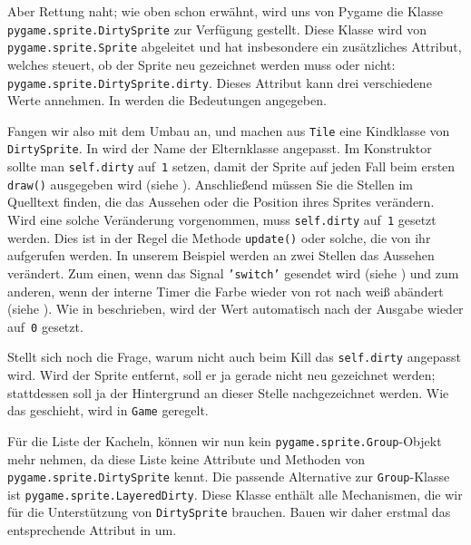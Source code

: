 
Aber Rettung naht; wie oben schon erwähnt, wird uns von Pygame die Klasse \texttt{pygame\-.sprite\-.Dirty\-Sprite} zur Verfügung gestellt. Diese Klasse wird von \texttt{pygame\-.sprite\-.Sprite} abgeleitet und hat insbesondere ein zusätzliches Attribut, welches steuert, ob der Sprite neu gezeichnet werden muss oder nicht: \texttt{pygame.sprite.DirtySprite.dirty}. Dieses Attribut kann drei verschiedene Werte annehmen. In  werden die Bedeutungen angegeben. 


Fangen wir also mit dem Umbau an, und machen aus \texttt{Tile} eine Kindklasse von \texttt{Dirty\-Sprite}. In  wird der Name der Elternklasse angepasst. Im Konstruktor sollte man \texttt{self.dirty} auf~\texttt{1} setzen, damit der Sprite auf jeden Fall beim ersten \texttt{draw()} ausgegeben wird (siehe ). Anschließend müssen Sie die Stellen im Quelltext finden, die das Aussehen oder die Position ihres Sprites verändern. Wird eine solche Veränderung vorgenommen, muss \texttt{self.dirty} auf~\texttt{1} gesetzt werden. Dies ist in der Regel die Methode \texttt{update()} oder solche, die von ihr aufgerufen werden. In unserem Beispiel werden an zwei Stellen das Aussehen verändert. Zum einen, wenn das Signal \texttt{'switch'} gesendet wird (siehe ) und zum anderen, wenn der interne Timer die Farbe wieder von rot nach weiß abändert (siehe ). Wie in  beschrieben, wird der Wert automatisch nach der Ausgabe wieder auf~\texttt{0} gesetzt.

Stellt sich noch die Frage, warum nicht auch beim Kill das \texttt{self.dirty} angepasst wird. Wird der Sprite entfernt, soll er ja gerade nicht neu gezeichnet werden; stattdessen soll ja der Hintergrund an dieser Stelle nachgezeichnet werden. Wie das geschieht, wird in \texttt{Game} geregelt.


Für die Liste der Kacheln, können wir nun kein \texttt{pygame.sprite.Group}-Objekt mehr nehmen, da diese Liste keine Attribute und Methoden von \texttt{pygame.sprite.DirtySprite} kennt. Die passende Alternative zur \texttt{Group}-Klasse ist \texttt{pygame.sprite.LayeredDirty}. Diese Klasse enthält alle Mechanismen, die wir für die Unterstützung von \texttt{DirtySprite} brauchen. Bauen wir daher erstmal das entsprechende Attribut in  um.

